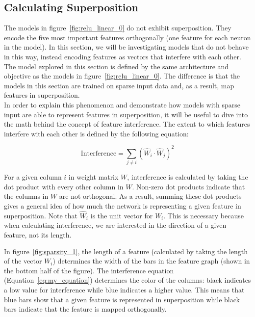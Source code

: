 \documentclass{article} %
\begin{document}
\subsection{Calculating Superposition}
\label{sec:calc_super}

The models in figure~\ref{fig:relu_linear_0} do not exhibit superposition. They
encode the five most important features orthogonally (one feature for each
neuron in the model). In this section, we will be investigating models
that do not behave in this way, instead encoding features as vectors that interfere
with each other. The model explored in this section is defined by the same architecture
and objective as the models in figure~\ref{fig:relu_linear_0}. The difference
is that the models in this section are trained on sparse input data and, as a
result, map features in superposition. \\

In order to explain this phenomenon and demonstrate how models with sparse input
are able to represent features in superposition, it will be useful to dive into 
the math behind the concept of feature interference. The extent to which 
features interfere with each other is defined by the following equation:

\begin{equation}
\label{eq:my_equation}
\text{Interference} = \sum_{j \neq i} (\hat{W}_i \cdot \hat{W}_j)^2
\end{equation}

For a given column $i$ in weight matrix $W$, interference is calculated by taking
the dot product with every other column in $W$. Non-zero dot products indicate
that the columns in $W$ are not orthogonal. As a result, summing these dot 
products gives a general idea of how much the network is representing a given
feature in superposition. Note that $\hat{W}_i$ is the unit vector for $W_i$. 
This is necessary because when calculating interference, we are interested in
the direction of a given feature, not its length.\newline

In figure~\ref{fig:sparsity_1}, the length of a feature (calculated by taking the
length of the vector $W_i$) determines the width of the bars in the feature
graph (shown in the bottom half of the figure). The interference equation (Equation~\ref{eq:my_equation}) determines the
color of the columns: black indicates a low value for interference
while blue indicates a higher value. This means that blue bars show that a given feature is represented
in superposition while black bars indicate that the feature is mapped orthogonally.
    
\end{document}
